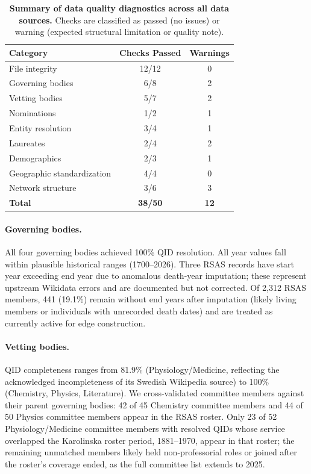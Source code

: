 \documentclass[12pt]{article}
\begin{document}
\begin{table}
\centering
\caption{\textbf{Summary of data quality diagnostics across all data sources.} Checks are classified as passed (no issues) or warning (expected structural limitation or quality note).}
\label{tab:diagnostics}
\small
\begin{tabular}{lcc}
\hline
\textbf{Category} & \textbf{Checks Passed} & \textbf{Warnings} \\
\hline
File integrity & 12/12 & 0 \\
Governing bodies & 6/8 & 2 \\
Vetting bodies & 5/7 & 2 \\
Nominations & 1/2 & 1 \\
Entity resolution & 3/4 & 1 \\
Laureates & 2/4 & 2 \\
Demographics & 2/3 & 1 \\
Geographic standardization & 4/4 & 0 \\
Network structure & 3/6 & 3 \\
\hline
\textbf{Total} & \textbf{38/50} & \textbf{12} \\
\hline
\end{tabular}
\end{table}

\paragraph*{Governing bodies.} All four governing bodies achieved 100\% QID resolution. All year values fall within plausible historical ranges (1700--2026). Three RSAS records have start year exceeding end year due to anomalous death-year imputation; these represent upstream Wikidata errors and are documented but not corrected. Of 2,312 RSAS members, 441 (19.1\%) remain without end years after imputation (likely living members or individuals with unrecorded death dates) and are treated as currently active for edge construction.

\paragraph*{Vetting bodies.} QID completeness ranges from 81.9\% (Physiology/Medicine, reflecting the acknowledged incompleteness of its Swedish Wikipedia source) to 100\% (Chemistry, Physics, Literature). We cross-validated committee members against their parent governing bodies: 42 of 45 Chemistry committee members and 44 of 50 Physics committee members appear in the RSAS roster. Only 23 of 52 Physiology/Medicine committee members with resolved QIDs whose service overlapped the Karolinska roster period, 1881--1970, appear in that roster; the remaining unmatched members likely held non-professorial roles or joined after the roster's coverage ended, as the full committee list extends to 2025.
\end{document}
